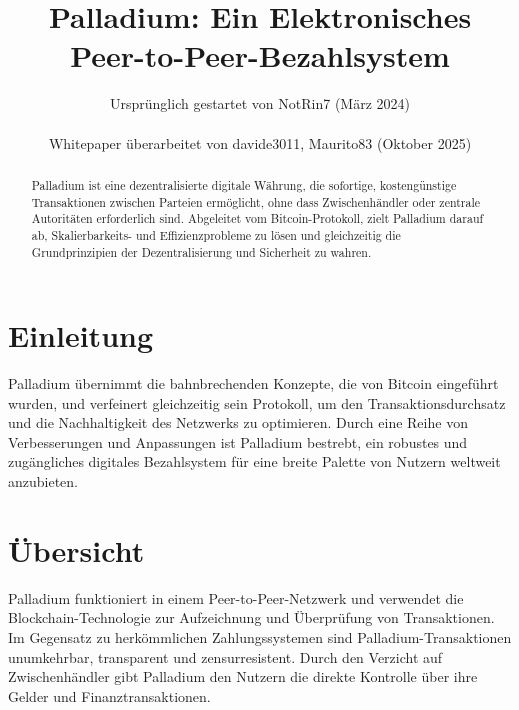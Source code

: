 \documentclass[11pt,a4paper]{article}
\title{\textbf{Palladium: Ein Elektronisches Peer-to-Peer-Bezahlsystem}}
\author{Ursprünglich gestartet von NotRin7 (März 2024) \\\\ Whitepaper überarbeitet von davide3011, Maurito83 (Oktober 2025)}
\date{}
\begin{document}
\maketitle

\begin{abstract}
Palladium ist eine dezentralisierte digitale Währung, die sofortige, kostengünstige Transaktionen zwischen Parteien ermöglicht, ohne dass Zwischenhändler oder zentrale Autoritäten erforderlich sind. Abgeleitet vom Bitcoin-Protokoll, zielt Palladium darauf ab, Skalierbarkeits- und Effizienzprobleme zu lösen und gleichzeitig die Grundprinzipien der Dezentralisierung und Sicherheit zu wahren.
\end{abstract}

\section{Einleitung}
Palladium übernimmt die bahnbrechenden Konzepte, die von Bitcoin eingeführt wurden, und verfeinert gleichzeitig sein Protokoll, um den Transaktionsdurchsatz und die Nachhaltigkeit des Netzwerks zu optimieren. Durch eine Reihe von Verbesserungen und Anpassungen ist Palladium bestrebt, ein robustes und zugängliches digitales Bezahlsystem für eine breite Palette von Nutzern weltweit anzubieten.

\section{Übersicht}
Palladium funktioniert in einem Peer-to-Peer-Netzwerk und verwendet die Blockchain-Technologie zur Aufzeichnung und Überprüfung von Transaktionen. Im Gegensatz zu herkömmlichen Zahlungssystemen sind Palladium-Transaktionen unumkehrbar, transparent und zensurresistent. Durch den Verzicht auf Zwischenhändler gibt Palladium den Nutzern die direkte Kontrolle über ihre Gelder und Finanztransaktionen.
\end{document}
